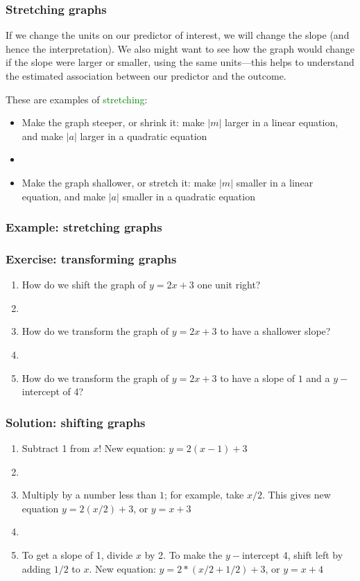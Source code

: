 \documentclass[11pt, hyperref={colorlinks, urlcolor=blue}]{beamer}
\newcommand{\myframe}[1]{\begin{frame} \frametitle{#1}}
\begin{document}
\myframe{Stretching graphs}
If we change the units on our predictor of interest, we will change the slope (and hence the interpretation). We also might want to see how the graph would change if the slope were larger or smaller, using the same units---this helps to understand the estimated association between our predictor and the outcome.

These are examples of \textcolor{green}{stretching}:
\begin{itemize}
\item Make the graph steeper, or shrink it: make $|m|$ larger in a linear equation, and make $|a|$ larger in a quadratic equation
\item[]
\item Make the graph shallower, or stretch it: make $|m|$ smaller in a linear equation, and make $|a|$ smaller in a quadratic equation
\end{itemize}
\end{frame}

\myframe{Example: stretching graphs}
\centering
{}
\end{frame}

\myframe{Exercise: transforming graphs}
\begin{enumerate}
\item How do we shift the graph of $y = 2x + 3$ one unit right?
\item[]
\item How do we transform the graph of $y = 2x + 3$ to have a shallower slope?
\item[]
\item How do we transform the graph of $y = 2x + 3$ to have a slope of $1$ and a $y-$intercept of 4?
\end{enumerate}
\end{frame}

\myframe{Solution: shifting graphs}
\begin{enumerate}
\item Subtract 1 from $x$! New equation: $y = 2(x-1) + 3$
\item[]
\item Multiply by a number less than $1$; for example, take $x/2$. This gives new equation $y = 2(x/2) + 3$, or $y = x + 3$
\item[]
\item To get a slope of 1, divide $x$ by 2. To make the $y-$intercept 4, shift left by adding $1/2$ to $x$. New equation: $y = 2*(x/2 + 1/2) + 3$, or $y = x + 4$
\end{enumerate}
\end{frame}
\end{document}

